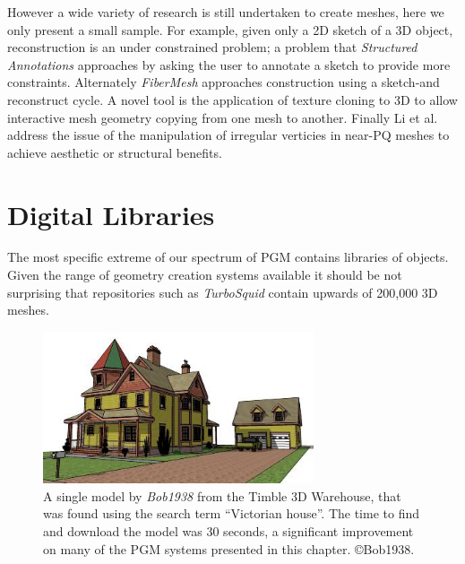 However a wide variety of research is still undertaken to create meshes, here we only present a small sample. For example, given only a 2D sketch of a 3D object, reconstruction is an under constrained problem; a problem that \emph{Structured Annotations}\cite{Gingold09} approaches by asking the user to annotate a sketch to provide more constraints. Alternately \emph{FiberMesh}\cite{Nealen07} approaches construction using a sketch-and reconstruct cycle. A novel tool is the application of texture cloning to 3D to allow interactive mesh geometry copying from one mesh to another\cite{Takayama11}. Finally Li et al.\cite{Li10} address the issue of the manipulation of irregular verticies in near-PQ meshes to achieve aesthetic or structural benefits. 


\section{Digital Libraries}
\label{s:digitalLibraries}

The most specific extreme of our spectrum of PGM contains libraries of objects. Given the range of geometry creation systems available it should be not surprising that repositories such as \emph{TurboSquid}\cite{TurboSquid} contain upwards of 200,000 3D meshes. 

\begin{figure}
  \centering
  \includegraphics[width=8cm]{warehouse.jpg}
  \caption[A model from a library]{A single model by \emph{Bob1938} from the Timble 3D Warehouse\cite{GoogleWarehouse}, that was found using the search term ``Victorian house''. The time to find and download the model was 30 seconds, a significant improvement on many of the PGM systems presented in this chapter. \copyright Bob1938.}
  \label{fig:warehouse}
\end{figure}

